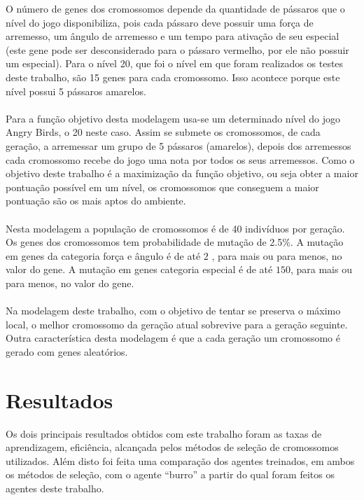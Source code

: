\documentclass[10pt,a4paper]{article}
\begin{document}
O número de genes dos cromossomos depende da quantidade de pássaros que o nível do jogo disponibiliza, pois cada pássaro deve possuir uma força de arremesso, um ângulo de arremesso e um tempo para ativação de seu especial (este gene pode ser desconsiderado para o pássaro vermelho, por ele não possuir um especial). Para o nível 20, que foi o nível em que foram realizados os testes deste trabalho, são 15 genes para cada cromossomo. Isso acontece porque este  nível possui 5 pássaros amarelos. \\ \\
Para a função objetivo desta modelagem usa-se um determinado nível do jogo Angry Birds, o 20 neste caso. Assim se submete os cromossomos, de cada geração, a arremessar um grupo de 5 pássaros (amarelos), depois dos arremessos cada cromossomo recebe do jogo uma nota por todos os seus arremessos. Como o objetivo deste trabalho é a maximização da função objetivo, ou seja obter a maior pontuação possível em um nível, os cromossomos que conseguem a maior pontuação são os mais aptos do ambiente. \\ \\
Nesta modelagem a população de cromossomos é de 40 indivíduos por geração. Os genes dos cromossomos tem probabilidade de mutação de 2.5\%. A mutação em genes da categoria força e ângulo é de até $2$ , para mais ou para menos, no valor do gene. A mutação em genes categoria especial é de até $150$, para mais ou para menos, no valor do gene. \\ \\
 Na modelagem deste trabalho, com o objetivo de tentar se preserva o máximo local, o melhor  cromossomo da geração atual sobrevive para a geração seguinte. Outra característica desta modelagem é que a cada geração um cromossomo é gerado com genes aleatórios.
\section{Resultados}
Os dois principais resultados obtidos com este trabalho foram as taxas de aprendizagem, eficiência, alcançada pelos métodos de seleção de cromossomos utilizados. Além disto foi feita uma comparação dos agentes treinados, em ambos os métodos de seleção, com o agente ``burro'' a partir do qual foram feitos os agentes deste trabalho. 
\end{document}
